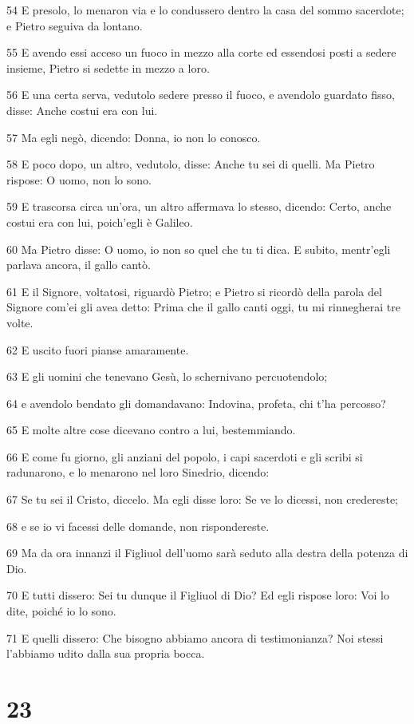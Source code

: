 \par 54 E presolo, lo menaron via e lo condussero dentro la casa del sommo sacerdote; e Pietro seguiva da lontano.
\par 55 E avendo essi acceso un fuoco in mezzo alla corte ed essendosi posti a sedere insieme, Pietro si sedette in mezzo a loro.
\par 56 E una certa serva, vedutolo sedere presso il fuoco, e avendolo guardato fisso, disse: Anche costui era con lui.
\par 57 Ma egli negò, dicendo: Donna, io non lo conosco.
\par 58 E poco dopo, un altro, vedutolo, disse: Anche tu sei di quelli. Ma Pietro rispose: O uomo, non lo sono.
\par 59 E trascorsa circa un'ora, un altro affermava lo stesso, dicendo: Certo, anche costui era con lui, poich'egli è Galileo.
\par 60 Ma Pietro disse: O uomo, io non so quel che tu ti dica. E subito, mentr'egli parlava ancora, il gallo cantò.
\par 61 E il Signore, voltatosi, riguardò Pietro; e Pietro si ricordò della parola del Signore com'ei gli avea detto: Prima che il gallo canti oggi, tu mi rinnegherai tre volte.
\par 62 E uscito fuori pianse amaramente.
\par 63 E gli uomini che tenevano Gesù, lo schernivano percuotendolo;
\par 64 e avendolo bendato gli domandavano: Indovina, profeta, chi t'ha percosso?
\par 65 E molte altre cose dicevano contro a lui, bestemmiando.
\par 66 E come fu giorno, gli anziani del popolo, i capi sacerdoti e gli scribi si radunarono, e lo menarono nel loro Sinedrio, dicendo:
\par 67 Se tu sei il Cristo, diccelo. Ma egli disse loro: Se ve lo dicessi, non credereste;
\par 68 e se io vi facessi delle domande, non rispondereste.
\par 69 Ma da ora innanzi il Figliuol dell'uomo sarà seduto alla destra della potenza di Dio.
\par 70 E tutti dissero: Sei tu dunque il Figliuol di Dio? Ed egli rispose loro: Voi lo dite, poiché io lo sono.
\par 71 E quelli dissero: Che bisogno abbiamo ancora di testimonianza? Noi stessi l'abbiamo udito dalla sua propria bocca.

\chapter{23}

